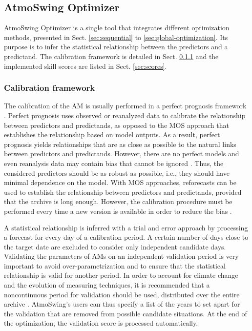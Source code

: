 \documentclass[review]{elsarticle}
\begin{document}
\subsection{AtmoSwing Optimizer}
\label{sec:optimizer}

AtmoSwing Optimizer is a single tool that integrates different optimization methods, presented in Sect. \ref{sec:sequential} to \ref{sec:global-optimization}. Its purpose is to infer the statistical relationship between the predictors and a predictand. The calibration framework is detailed in Sect. \ref{sec:calibration-framework} and the implemented skill scores are listed in Sect. \ref{sec:scores}.


\subsubsection{Calibration framework}
\label{sec:calibration-framework}

The calibration of the AM is usually performed in a perfect prognosis \citep{Klein1959} framework \citep{Bontron2004, BenDaoud2010}. Perfect prognosis uses observed or reanalyzed data to calibrate the relationship between predictors and predictands, as opposed to the MOS approach that establishes the relationship based on model outputs. As a result, perfect prognosis yields relationships that are as close as possible to the natural links between predictors and predictands. However, there are no perfect models and even reanalysis data may contain bias that cannot be ignored \citep{Dayon2015, Horton2018b}. Thus, the considered predictors should be as robust as possible, i.e., they should have minimal dependence on the model. With MOS approaches, reforecasts can be used to establish the relationship between predictors and predictands, provided that the archive is long enough. However, the calibration procedure must be performed every time a new version is available in order to reduce the bias \citep{Wilson2002}.

A statistical relationship is inferred with a trial and error approach by processing a forecast for every day of a calibration period. A certain number of days close to the target date are excluded to consider only independent candidate days. Validating the parameters of AMs on an independent validation period is very important to avoid over-parametrization and to ensure that the statistical relationship is valid for another period. In order to account for climate change and the evolution of measuring techniques, it is recommended that a noncontinuous period for validation should be used, distributed over the entire archive \citep{BenDaoud2010, Horton2018b}. AtmoSwing's users can thus specify a list of the years to set apart for the validation that are removed from possible candidate situations. At the end of the optimization, the validation score is processed automatically.
\end{document}
